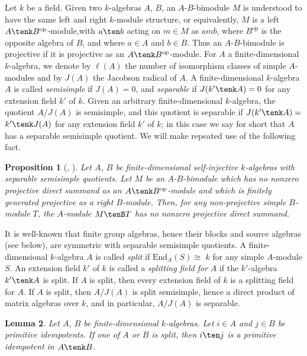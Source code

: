 \documentclass{amsart}
\theoremstyle{plain}\newtheorem{Theorem}{Theorem}[section]
\theoremstyle{plain}\newtheorem{Conjecture}[Theorem]{Conjecture}
\theoremstyle{plain}\newtheorem{Corollary}[Theorem]{Corollary}
\theoremstyle{plain}\newtheorem{Lemma}[Theorem]{Lemma}
\theoremstyle{plain}\newtheorem{Proposition}[Theorem]{Proposition}
\theoremstyle{definition}\newtheorem{Definition}[Theorem]{Definition}
\theoremstyle{definition}\newtheorem{Example}[Theorem]{Example}
\theoremstyle{definition}\newtheorem{Examples}[Theorem]{Examples}
\theoremstyle{definition}\newtheorem{Exercise}[Theorem]{Exercise}
\theoremstyle{definition}\newtheorem{Notation}[Theorem]{Notation}
\theoremstyle{definition}\newtheorem{Remark}[Theorem]{Remark}
\theoremstyle{definition}\newtheorem{Remarks}[Theorem]{Remarks}
\theoremstyle{plain}\newtheorem{Statement}[Theorem]{}
\def\End{\mathrm{End}}
\def\op{\mathrm{op}}
\begin{document}
Let $k$ be a field.  Given two $k$-algebras $A$, $B$, an $A$-$B$-bimodule $M$ is
understood to have the same left and right $k$-module structure, or equivalently,
$M$ is a left $A\tenk B^\op$-module,with $a\ten b$ acting on $m\in M$ as $amb$,
where $B^\op$ is the opposite algebra of $B$, and where $a\in A$ and $b\in B$. 
Thus an $A$-$B$-bimodule is projective if it is projective as an  
$A\tenk B^\op$-module. For $A$ a finite-dimensional $k$-algebra, we denote by
$\ell(A)$ the number of isomorphism classes of simple $A$-modules and by
$J(A)$ the Jacobson radical of $A$.
A finite-dimensional $k$-algebra $A$ is called {\em semisimple} if $J(A)=0$, and
{\em separable} if  $J(k'\tenk A)=0$ for any extension field $k'$ of $k$.
Given an arbitrary finite-dimensional $k$-algebra, the quotient $A/J(A)$ is
semisimple, and this quotient is separable if $J(k'\tenk A)=$ $k'\tenk J(A)$ for
any extension field $k'$ of $k$; in this case we say for short that $A$ has a
separable semisimple quotient. 
We will  make repeated  use of  the following fact.

\begin{Proposition}[{\cite[Proposition 4.14.9]{LiBookI}, 
\cite[Proposition 2.3]{Listable}}]  \label{no-proj-summands-Prop}
Let $A$, $B$ be finite-dimensional self-injective $k$-algebras with
separable semisimple quotients. Let $M$ be an $A$-$B$-bimodule
which has no nonzero projective direct summand as an $A\tenk B^\op$-module
and which is finitely generated projective as a right $B$-module. 
Then, for any non-projective simple $B$-module $T$, the $A$-module $M\tenB T$
has no nonzero projective direct summand.
\end{Proposition}


It is well-known that finite group algebras, hence their blocks and source algebras
(see below), are symmetric with separable semisimple quotients. 
A finite-dimensional $k$-algebra $A$ is called {\em split} if $\End_A(S)\cong$ 
$k$ for any simple $A$-module $S$.  An extension field $k'$ of $k$ is called a
{\em splitting field for} $A$ if the $k'$-algebra $k'\tenk A$ is split.
If $A$ is split, then every extension field of $k$ is a splitting field for $A$.
If $A$ is split, then $A/J(A)$ is split semisimple, hence a direct product of
matrix algebras over $k$, and in particular, $A/J(A)$ is separable. 

\begin{Lemma} \label{ij-primitive-Lemma}
Let $A$, $B$ be finite-dimensional $k$-algebras. Let $i\in A$ and $j\in B$ be
primitive idempotents. If one of $A$ or $B$ is split, then $i\ten j$ is a primitive
idempotent in $A\tenk B$. 
\end{Lemma}
\end{document}
